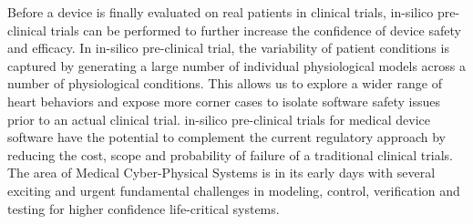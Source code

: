 Before a device is finally evaluated on real patients in clinical trials, in-silico pre-clinical trials can be performed to further increase the confidence of device safety and efficacy.
In in-silico pre-clinical trial, the variability of patient conditions is captured by generating a large number of individual physiological models across a number of physiological conditions. 
This allows us to explore a wider range of heart behaviors and expose more corner cases to isolate software safety issues prior to an actual clinical trial. 
in-silico pre-clinical trials for medical device software have the potential to complement the current regulatory approach by reducing the cost, scope and probability of failure of a traditional clinical trials. 
The area of Medical Cyber-Physical Systems is in its early days with several exciting and urgent fundamental challenges in modeling, control, verification and testing for higher confidence life-critical systems.


